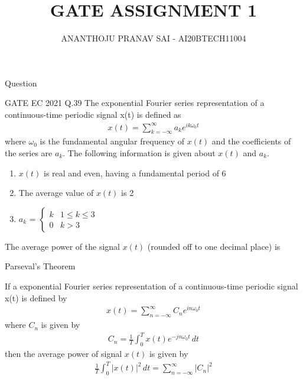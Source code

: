 \documentclass{beamer}
\title{GATE ASSIGNMENT 1}
\author{ANANTHOJU PRANAV SAI - AI20BTECH11004}
\begin{document}
\begin{frame}
\titlepage
\end{frame}
\begin{frame}{Question}
    \begin{block}{GATE EC 2021 Q.39}
    The exponential Fourier series representation of a continuous-time periodic signal x(t) is defined as 
    \begin{align}
    x(t) = \sum_{k=-\infty}^{\infty}a_{k}e^{ik\omega_0t}
    \end{align}
    where $\omega_0$ is the fundamental angular frequency of $x(t)$ and the coefficients of the series are $a_k$. The following information is given about $x(t)$ and $a_k$.
    \begin{enumerate}[label=\Roman*]
    \item $x(t)$ is real and even, having a fundamental period of 6
    \item The average value of $x(t)$ is 2
    \item $a_k$ = $\begin{cases} 
                    k & 1\leq k\leq 3\\
                    0 & k>3
                  \end{cases}$
    \end{enumerate}
The average power of the signal $x(t)$ (rounded off to one decimal place) is
    \end{block}
\end{frame}
\begin{frame}{Parseval's Theorem}
\begin{theorem}
If a exponential Fourier series representation of a continuous-time periodic signal x(t) is defined by 
\begin{align}
    x(t) = \sum_{n=-\infty}^{\infty}C_{n}e^{in\omega_0t}
\end{align}
where $C_n$ is given by
\begin{align}
    C_n = \frac{1}{T}\int_{0}^{T}x(t)e^{-jn\omega_0t}\,dt
\end{align}
then the average power of signal $x(t)$ is given by
\begin{align}
    \frac{1}{T}\int_{0}^{T}\lvert x(t)\rvert^2\,dt = \sum_{n=-\infty}^{\infty}\lvert C_n\rvert^2
\end{align}
\end{theorem}
\end{frame}
\end{document}

